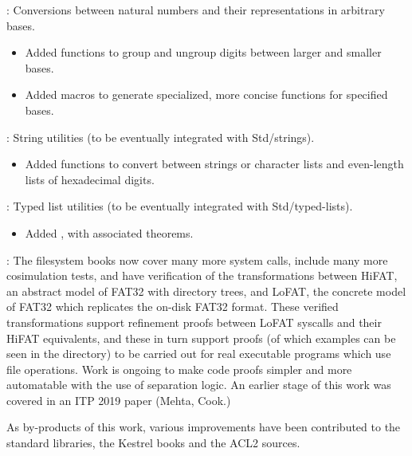
\begin{frame}

\implibtitle

:
Conversions between natural numbers
and their representations in arbitrary bases.
\begin{itemize}
\item
Added functions to group and ungroup digits between larger and smaller bases.
\item
Added macros to generate specialized, more concise functions
for specified bases.
\end{itemize}

\separation

:
String utilities (to be eventually integrated with Std/strings).
\begin{itemize}
\item
Added functions to convert between strings or character lists
and even-length lists of hexadecimal digits.
\end{itemize}

\separation

:
Typed list utilities (to be eventually integrated with Std/typed-lists).
\begin{itemize}
\item
Added , with associated theorems.
\end{itemize}

\end{frame}


\begin{frame}

\implibtitle

:
The filesystem books now cover many more system calls, include many
more cosimulation tests, and have verification of the transformations
between HiFAT, an abstract model of FAT32 with directory trees, and
LoFAT, the concrete model of FAT32 which replicates the on-disk FAT32
format. These verified transformations support refinement proofs
between LoFAT syscalls and their HiFAT equivalents, and these in turn
support proofs (of which examples can be seen in the directory)
to be carried out for real executable programs which use file
operations. Work is ongoing to make code proofs simpler and more
automatable with the use of separation logic. An earlier stage of
this work was covered in an ITP 2019 paper (Mehta, Cook.)

As by-products of this work, various improvements have been
contributed to the standard libraries, the Kestrel books and the ACL2
sources.

\end{frame}

